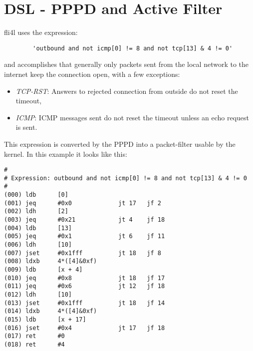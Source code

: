 {
\section {DSL - PPPD and Active Filter}
}


fli4l uses the expression:
\begin{example}
\begin{verbatim}
        'outbound and not icmp[0] != 8 and not tcp[13] & 4 != 0'
\end{verbatim}
\end{example}
and accomplishes that generally only packets sent from the local 
network to the internet keep the connection open, with a few
exceptions:
\begin{itemize}
\item \emph{TCP-RST}: Answers to rejected connection from outside do
  not reset the timeout,
\item \emph{ICMP}: ICMP messages sent do not reset the timeout
  unless an echo request is sent.
\end{itemize}

This expression is converted by the PPPD into a packet-filter 
usable by the kernel. In this example it looks like this:

\begin{example}
\begin{verbatim}
#
# Expression: outbound and not icmp[0] != 8 and not tcp[13] & 4 != 0
#
(000) ldb      [0]
(001) jeq      #0x0             jt 17   jf 2
(002) ldh      [2]
(003) jeq      #0x21            jt 4    jf 18
(004) ldb      [13]
(005) jeq      #0x1             jt 6    jf 11
(006) ldh      [10]
(007) jset     #0x1fff          jt 18   jf 8
(008) ldxb     4*([4]&0xf)
(009) ldb      [x + 4]
(010) jeq      #0x8             jt 18   jf 17
(011) jeq      #0x6             jt 12   jf 18
(012) ldh      [10]
(013) jset     #0x1fff          jt 18   jf 14
(014) ldxb     4*([4]&0xf)
(015) ldb      [x + 17]
(016) jset     #0x4             jt 17   jf 18
(017) ret      #0
(018) ret      #4
\end{verbatim}
\end{example}
